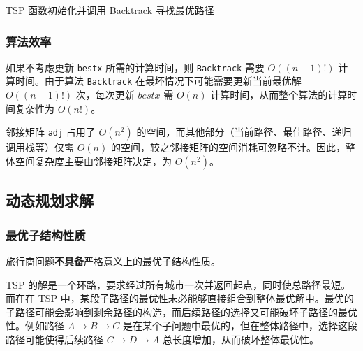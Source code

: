 \begin{algorithm}[htbp]
    \SetAlgoLined
    
    \caption{TSP 函数初始化并调用 Backtrack 寻找最优路径}
    \label{alg:tsp}
    
    
\end{algorithm}
\subsubsection{算法效率}
如果不考虑更新 \texttt{bestx} 所需的计算时间，则 \texttt{Backtrack} 需要 $O((n-1)!)$ 计算时间。由于算法 \texttt{Backtrack} 在最坏情况下可能需要更新当前最优解 $O((n-1)!)$ 次，每次更新 $bestx$ 需 $O(n)$ 计算时间，从而整个算法的计算时间复杂性为 $O(n!)$。

邻接矩阵 \texttt{adj} 占用了 $O(n^2)$ 的空间，而其他部分（当前路径、最佳路径、递归调用栈等）仅需 $O(n)$ 的空间，较之邻接矩阵的空间消耗可忽略不计。因此，整体空间复杂度主要由邻接矩阵决定，为 $O(n^2)$。

\subsection{动态规划求解}

\subsubsection{最优子结构性质}

旅行商问题\textbf{不具备}严格意义上的最优子结构性质。

TSP 的解是一个环路，要求经过所有城市一次并返回起点，同时使总路径最短。而在在 TSP 中，某段子路径的最优性未必能够直接组合到整体最优解中。最优的子路径可能会影响到剩余路径的构造，而后续路径的选择又可能破坏子路径的最优性。例如路径 $A\to B\to C$ 是在某个子问题中最优的，但在整体路径中，选择这段路径可能使得后续路径 $C\to D\to A$ 总长度增加，从而破坏整体最优性。

